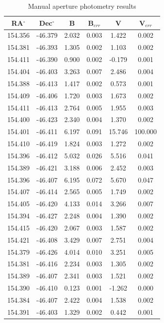 \documentclass[11pt]{article}
\begin{document}
\begin{table}
\caption{Manual aperture photometry results}

\begin{minipage}{0.48\paperwidth}
\centering
\begin{tabular}{cccccc}
\toprule
RA$^{\circ}$ & Dec$^{\circ}$ & B & B$_{err}$ & V & V$_{err}$ \\
\midrule
154.356 & -46.379 & 2.032 & 0.003 & 1.422 & 0.002 \\
154.381 & -46.393 & 1.305 & 0.002 & 1.103 & 0.002 \\
154.411 & -46.390 & 0.900 & 0.002 & -0.179 & 0.001 \\
154.404 & -46.403 & 3.263 & 0.007 & 2.486 & 0.004 \\
154.388 & -46.413 & 1.417 & 0.002 & 0.573 & 0.001 \\
154.409 & -46.406 & 1.720 & 0.003 & 1.673 & 0.002 \\
154.411 & -46.413 & 2.764 & 0.005 & 1.955 & 0.003 \\
154.400 & -46.423 & 2.340 & 0.004 & 1.370 & 0.002 \\
154.401 & -46.411 & 6.197 & 0.091 & 15.746 & 100.000 \\
154.410 & -46.419 & 1.824 & 0.003 & 1.272 & 0.002 \\
154.396 & -46.412 & 5.032 & 0.026 & 5.516 & 0.041 \\
154.389 & -46.421 & 3.188 & 0.006 & 2.452 & 0.003 \\
154.396 & -46.407 & 6.195 & 0.072 & 5.670 & 0.047 \\
154.407 & -46.414 & 2.565 & 0.005 & 1.749 & 0.002 \\
154.405 & -46.420 & 4.133 & 0.014 & 3.266 & 0.007 \\
154.394 & -46.427 & 2.248 & 0.004 & 1.390 & 0.002 \\
154.415 & -46.420 & 2.067 & 0.003 & 1.587 & 0.002 \\
154.421 & -46.408 & 3.429 & 0.007 & 2.751 & 0.004 \\
154.379 & -46.426 & 4.014 & 0.010 & 3.251 & 0.005 \\
154.381 & -46.416 & 2.234 & 0.003 & 1.305 & 0.002 \\
154.389 & -46.407 & 2.341 & 0.003 & 1.521 & 0.002 \\
154.390 & -46.410 & 0.123 & 0.001 & -1.262 & 0.000 \\
154.384 & -46.407 & 2.422 & 0.004 & 1.538 & 0.002 \\
154.391 & -46.403 & 1.329 & 0.002 & 0.442 & 0.001 \\

\end{tabular}
\end{minipage}
\end{table}
\end{document}
